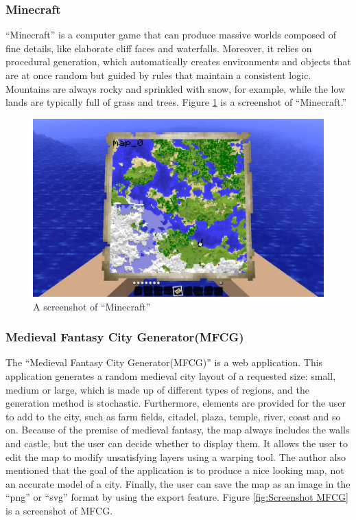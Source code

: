 \subsubsection{Minecraft}
\label{sec:Introduction>Similar Systems>Minecraft}
``Minecraft'' is a computer game that can produce massive worlds composed of fine details, like elaborate cliff faces and waterfalls. Moreover, it relies on procedural generation, which automatically creates environments and objects that are at once random but guided by rules that maintain a consistent logic. Mountains are always rocky and sprinkled with snow, for example, while the low lands are typically full of grass and trees. Figure \ref{fig:Screenshot Minecraft} is a screenshot of ``Minecraft.''

\begin{figure}[!htb]
\centering
\includegraphics[width=\textwidth]{section01/assets/screenshot_Minecraft.jpg}
\caption[A screenshot of ``Minecraft'']{\label{fig:Screenshot Minecraft}A screenshot of ``Minecraft''}
\end{figure}

\subsubsection{Medieval Fantasy City Generator(MFCG)}
\label{sec:Introduction>Similar Systems>MFCG}
The ``Medieval Fantasy City Generator(MFCG)'' is a web application. This application generates a random medieval city layout of a requested size: small, medium or large, which is made up of different types of regions, and the generation method is stochastic. Furthermore, elements are provided for the user to add to the city, such as farm fields, citadel, plaza, temple, river, coast and so on. Because of the premise of medieval fantasy, the map always includes the walls and castle, but the user can decide whether to display them. It allows the user to edit the map to modify unsatisfying layers using a warping tool. The author also mentioned that the goal of the application is to produce a nice looking map, not an accurate model of a city. Finally, the user can save the map as an image in the ``png'' or ``svg'' format by using the export feature. Figure \ref{fig:Screenshot MFCG} is a screenshot of MFCG.

